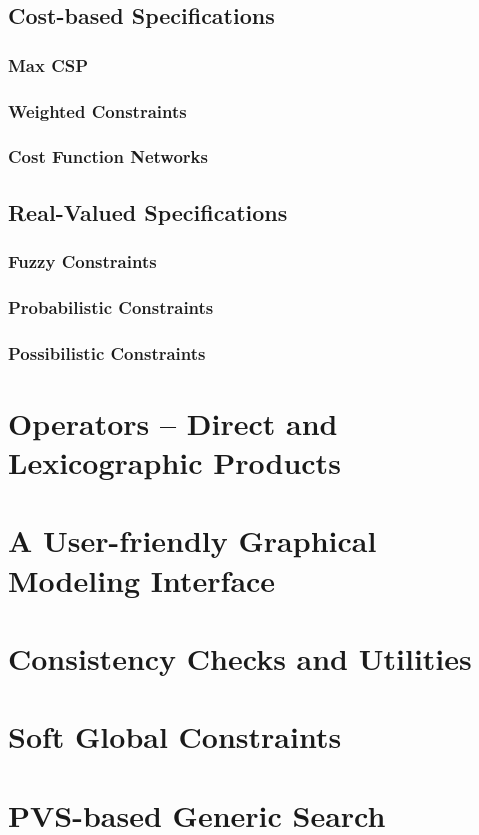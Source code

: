 \documentclass[10pt,a4paper]{book}
\begin{document}
\subsection{Cost-based Specifications}
\subsubsection{Max CSP}
\subsubsection{Weighted Constraints}
\subsubsection{Cost Function Networks}
\subsection{Real-Valued Specifications}
\subsubsection{Fuzzy Constraints}
\subsubsection{Probabilistic Constraints}
\subsubsection{Possibilistic Constraints}
\section{Operators -- Direct and Lexicographic Products}
\section{A User-friendly Graphical Modeling Interface}
\section{Consistency Checks and Utilities}
\section{Soft Global Constraints}
\section{PVS-based Generic Search}
\end{document}
